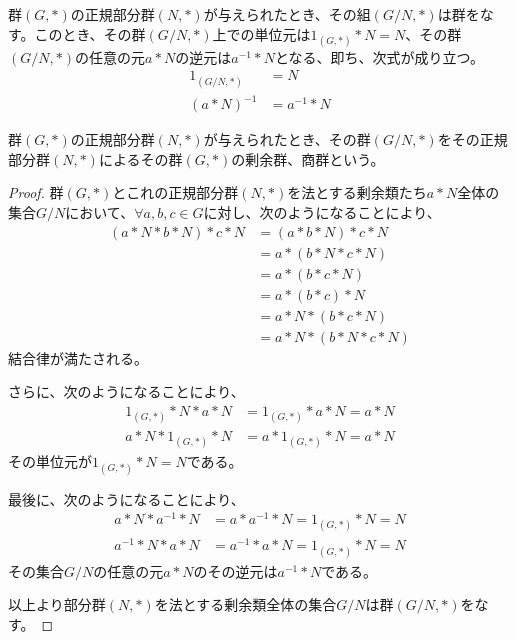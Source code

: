 \documentclass[dvipdfmx]{jsarticle}
\begin{document}
\begin{thm}\label{3.1.1.30}
群$(G,*)$の正規部分群$(N,*)$が与えられたとき、その組$\left( {G}/{N},* \right)$は群をなす。このとき、その群$\left( {G}/{N},* \right)$上での単位元は$1_{(G,*)}*N = N$、その群$\left( {G}/{N},* \right)$の任意の元$a*N$の逆元は$a^{- 1}*N$となる、即ち、次式が成り立つ。
\begin{align*}
1_{\left( {G}/{N},* \right)} &= N\\
(a*N)^{- 1} &= a^{- 1}*N
\end{align*}
\end{thm}
\begin{dfn}
群$(G,*)$の正規部分群$(N,*)$が与えられたとき、その群$\left( {G}/{N},* \right)$をその正規部分群$(N,*)$によるその群$(G,*)$の剰余群、商群という。
\end{dfn}
\begin{proof}
群$(G,*)$とこれの正規部分群$(N,*)$を法とする剰余類たち$a*N$全体の集合${G}/{N}$において、$\forall a,b,c \in G$に対し、次のようになることにより、
\begin{align*}
(a*N*b*N)*c*N &= (a*b*N)*c*N\\
&= a*(b*N*c*N)\\
&= a*(b*c*N)\\
&= a*(b*c)*N\\
&= a*N*(b*c*N)\\
&= a*N*(b*N*c*N)
\end{align*}
結合律が満たされる。\par
さらに、次のようになることにより、
\begin{align*}
1_{(G,*)}*N*a*N &= 1_{(G,*)}*a*N = a*N\\
a*N*1_{(G,*)}*N &= a*1_{(G,*)}*N = a*N
\end{align*}
その単位元が$1_{(G,*)}*N = N$である。\par
最後に、次のようになることにより、
\begin{align*}
a*N*a^{- 1}*N &= a*a^{- 1}*N = 1_{(G,*)}*N = N\\
a^{- 1}*N*a*N &= a^{- 1}*a*N = 1_{(G,*)}*N = N
\end{align*}
その集合${G}/{N}$の任意の元$a*N$のその逆元は$a^{- 1}*N$である。\par
以上より部分群$(N,*)$を法とする剰余類全体の集合${G}/{N}$は群$\left( {G}/{N},* \right)$をなす。
\end{proof}
\end{document}
